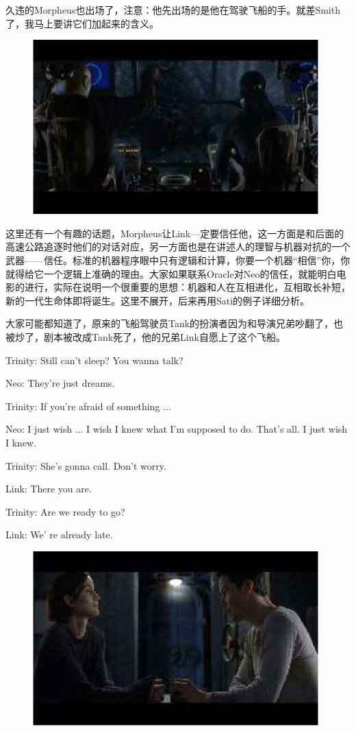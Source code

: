 \documentclass{ctexart}
\newenvironment{myquote}{\color{green} \setlength{\leftskip}{6em} \setlength{\rightskip}{4em} \setlength{\parindent}{-2em}}{\par}
\begin{document}
久违的Morpheus也出场了，注意：他先出场的是他在驾驶飞船的手。就差Smith了，我马上要讲它们加起来的含义。

\begin{figure}[htb]
\centering
\includegraphics[width=0.5\linewidth]{fig/read_reloaded-13}
\end{figure}

这里还有一个有趣的话题，Morpheus让Link—定要信任他，这一方面是和后面的高速公路追逐时他们的对话对应，另一方面也是在讲述人的理智与机器对抗的一个武器——信任。标准的机器程序眼中只有逻辑和计算，你要一个机器“相信”你，你就得给它一个逻辑上准确的理由。大家如果联系Oracle对Neo的信任，就能明白电影的进行，实际在说明一个很重要的思想：机器和人在互相进化，互相取长补短，新的一代生命体即将诞生。这里不展开，后来再用Sati的例子详细分析。

大家可能都知道了，原来的飞船驾驶员Tank的扮演者因为和导演兄弟吵翻了，也被炒了，剧本被改成Tank死了，他的兄弟Link自愿上了这个飞船。

\begin{myquote}
Trinity: Still can't sleep? You wanna talk?

Neo: They're just dreams.

Trinity: If you're afraid of something ...

Neo: I just wish ... I wish I knew what I'm supposed to do. That's all. I just wish I knew.

Trinity: She's gonna call. Don't worry.

Link: There you are.

Trinity: Are we ready to go?

Link: We' re already late.
\end{myquote}

\begin{figure}[htb]
\centering
\includegraphics[width=0.5\linewidth]{fig/read_reloaded-14}
\end{figure}
\end{document}
